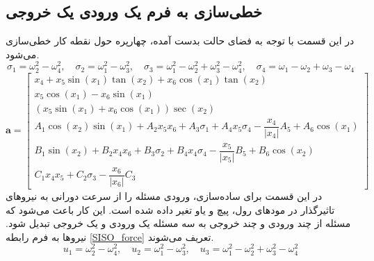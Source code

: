 \subsection{خطی‌سازی به فرم یک ورودی یک خروجی}\label{lin_SISO}
در این قسمت با توجه به فضای حالت بدست آمده، چهارپره حول نقطه کار خطی‌سازی می‌شود.
\begin{equation*}
	\sigma_1 = \omega_2^2-\omega_4^2,\quad \sigma_2 = \omega_1^2-\omega_3^2,
	\quad \sigma_3 = \omega_1^2-\omega_2^2+\omega_3^2-\omega_4^2,\quad \sigma_4 = \omega_1-\omega_2+\omega_3-\omega_4
\end{equation*}
\begin{equation*}
	\boldsymbol a = \begin{bmatrix}
		x_4 + x_5\sin(x_1)\tan(x_2) + x_6\cos(x_1)\tan(x_2)\\
		x_5\cos(x_1)- x_6\sin(x_1)\\
		(x_5\sin(x_1) + x_6\cos(x_1))\sec(x_2)\\
		A_1\cos(x_2)\sin(x_1) + 
		A_2x_5x_6 + A_3\sigma_1+
		A_4x_5\sigma_4- \dfrac{x_4}{\lvert x_4\rvert}A_5+A_6\cos(x_1)\\
		B_1\sin(x_2) + 
		B_2x_4x_6 + B_3\sigma_2+
		B_4x_4\sigma_4- \dfrac{x_5}{\lvert x_5\rvert}B_5 + B_6\cos(x_2)\\
		C_1x_4x_5 + 
		C_2\sigma_3- \dfrac{x_6}{\lvert x_6\rvert}C_3
	\end{bmatrix}
\end{equation*} 
در این قسمت برای ساده‌سازی، ورودی مسئله را از سرعت دورانی به نیروهای تاثیرگذار در مودهای رول، پیچ و یاو تغیر داده شده است. این کار باعث می‌شود که مسئله از چند ورودی و چند خروجی به سه مسئله یک ورودی و یک خروجی تبدیل شود. نیروها به فرم رابطه 
\ref{SISO_force}
تعریف می‌شوند.
\begin{equation}\label{SISO_force}
	u_1 = \omega_2^2 - \omega_4^2, \quad
	u_2 = \omega_1^2 - \omega_3^2, \quad
	u_3 = \omega_1^2 - \omega_2^2  + \omega_3^2 - \omega_4^2
\end{equation}
